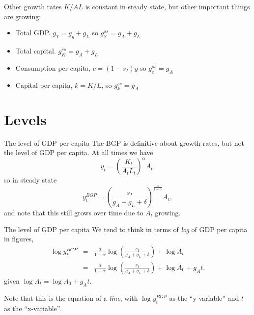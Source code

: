 \begin{frame}{Other growth rates}
$K/AL$ is constant in steady state, but other important things are growing:
\begin{itemize}
	\item Total GDP. $g_Y = g_y + g_L$ so $g_Y^{ss} = g_A + g_L$
	\item Total capital. $g_K^{ss} = g_A + g_L$
	\item Consumption per capita, $c = (1-s_I)y$ so $g_c^{ss} = g_A$
	\item Capital per capita, $k = K/L$, so $g_k^{ss} = g_A$
\end{itemize}
\end{frame}

\section{Levels}
\begin{frame}{The level of GDP per capita}
The BGP is definitive about growth rates, but not the level of GDP per capita. At all times we have
\begin{equation}
	y_t = \left(\frac{K_t}{A_tL_t}\right)^{\alpha} A_t \nonumber. 
\end{equation}
so in steady state
\begin{equation}
	y_t^{BGP} = \left(\frac{s_I}{g_A + g_L + \delta}\right)^{\frac{\alpha}{1-\alpha}} A_t \label{EQ_y_BGP},
\end{equation}
and note that this still grows over time due to $A_t$ growing. 
\end{frame}

\begin{frame}{The level of GDP per capita}
We tend to think in terms of \textit{log} of GDP per capita in figures,
\begin{eqnarray}
	\log y_t^{BGP} &=& \frac{\alpha}{1-\alpha} \log \left(\frac{s_I}{g_A + g_L + \delta} \right) + \log A_t \nonumber \\ 
	     &=& \frac{\alpha}{1-\alpha} \log \left(\frac{s_I}{g_A + g_L + \delta} \right) + \log A_0 + g_A t. \label{EQ_logy_BGP} \nonumber
\end{eqnarray}
given $\log A_t = \log A_0 + g_A t$. 

\vspace{.25in}\noindent Note that this is the equation of a \textit{line}, with $\log y_t^{BGP}$ as the ``y-variable'' and $t$ as the ``x-variable''. 

\end{frame}


